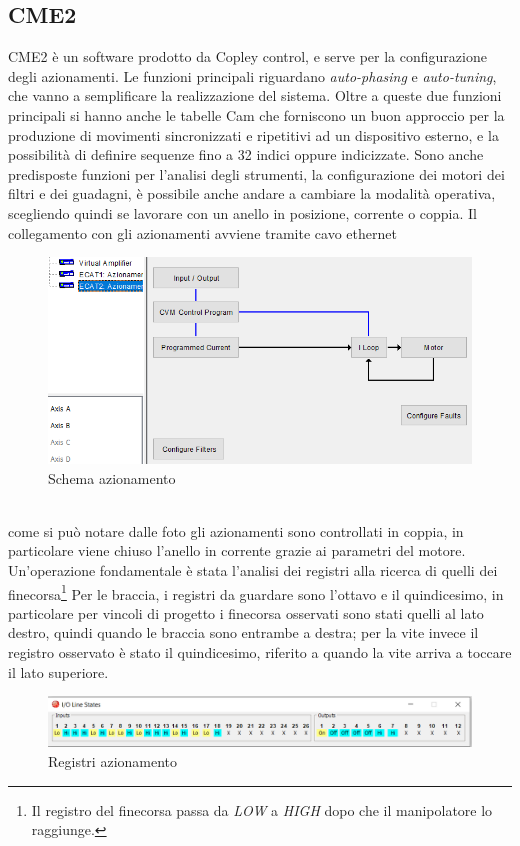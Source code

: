 \subsection{CME2}
CME2 è un software prodotto da Copley control, e serve per la configurazione degli azionamenti. Le funzioni principali riguardano \textit{auto-phasing} e \textit{auto-tuning}, che vanno a semplificare la realizzazione del sistema. Oltre a queste due funzioni principali si hanno anche le tabelle Cam che forniscono un buon approccio per la produzione di movimenti sincronizzati e ripetitivi ad un dispositivo esterno, e la possibilità di definire sequenze fino a 32 indici oppure indicizzate. Sono anche predisposte funzioni per l'analisi degli strumenti, la configurazione dei motori dei filtri e dei guadagni, è possibile anche andare a cambiare la modalità operativa, scegliendo quindi se lavorare con un anello in posizione, corrente o coppia. Il collegamento con gli azionamenti avviene tramite cavo ethernet
\begin{figure}[ht]
\begin{center}
    \includegraphics[scale=0.8]{Immagini/Sperimentale/azionamenti.PNG}
    \caption{Schema azionamento}
\end{center}
\end{figure}
\\come si può notare dalle foto gli azionamenti sono controllati in coppia, in particolare viene chiuso l'anello in corrente grazie ai parametri del motore. Un'operazione fondamentale è stata l'analisi dei registri alla ricerca di quelli dei finecorsa\footnote{Il registro del finecorsa passa da \textit{LOW} a \textit{HIGH} dopo che il manipolatore lo raggiunge.}
Per le braccia, i registri da guardare sono l'ottavo e il quindicesimo, in particolare per vincoli di progetto i finecorsa osservati sono stati quelli al lato destro, quindi quando le braccia sono entrambe a destra; per la vite invece il registro osservato è stato il quindicesimo, riferito a quando la vite arriva a toccare il lato superiore.
\begin{figure}[ht]
\begin{center}
    \includegraphics[scale=0.6]{Immagini/Sperimentale/registri.PNG}
    \caption{Registri azionamento}
\end{center}
\end{figure}
